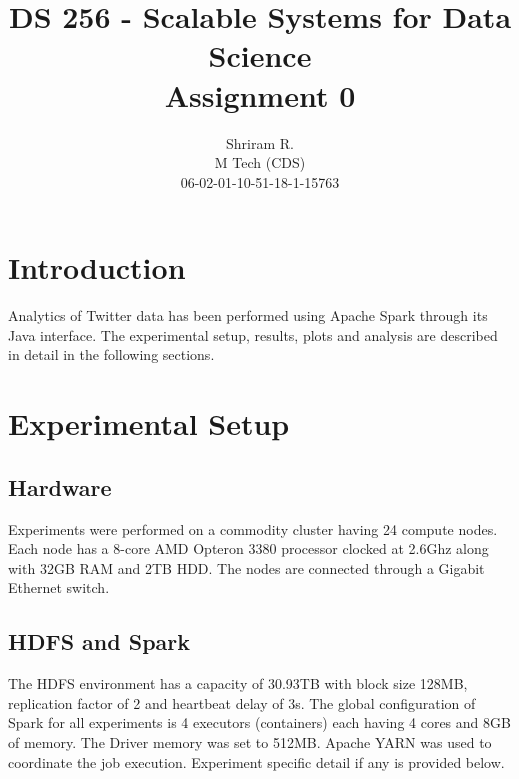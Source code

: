 \documentclass[11pt,a4paper,oneside]{article}
\begin{document}
	\title{DS 256 - Scalable Systems for Data Science \\ Assignment 0}
	\author{Shriram R. \\ M Tech (CDS) \\ 06-02-01-10-51-18-1-15763}
	\maketitle
	
	\section{Introduction}
	Analytics of Twitter data has been performed using Apache Spark through its Java interface. The experimental setup, results, plots and analysis are described in detail in the following sections.
     
    \section{Experimental Setup}
    
    \subsection{Hardware}
    Experiments were performed on a commodity cluster having 24 compute nodes. Each node has a 8-core AMD Opteron 3380 processor clocked at 2.6Ghz along with 32GB RAM and 2TB HDD. The nodes are connected through a Gigabit Ethernet switch.
    
    \subsection{HDFS and Spark}
    The HDFS environment has a capacity of 30.93TB with block size 128MB, replication factor of 2 and heartbeat delay of 3s. The global configuration of Spark for all experiments is 4 executors (containers) each having 4 cores and 8GB of memory. The Driver memory was set to 512MB. Apache YARN was used to coordinate the job execution. Experiment specific detail if any is provided below.
    
\end{document}
